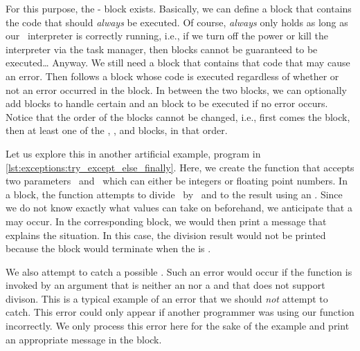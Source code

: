 For this purpose, the - block exists.
Basically, we can define a  block that contains the code that should \emph{always} be executed.
Of course, \emph{always} only holds as long as our \python\ interpreter is correctly running, i.e., if we turn off the power or kill the interpreter via the task manager, then  blocks cannot be guaranteed to be executed{\dots}
Anyway.
We still need a  block that contains that code that may cause an error.
Then follows a  block whose code is executed regardless of whether or not an error occurred in the  block.
In between the two blocks, we can optionally add  blocks to handle certain  and an  block to be executed if no error occurs.
Notice that the order of the blocks cannot be changed, i.e., first comes the  block, then at least one of the , , and  blocks, in that order.
%
%
\FloatBarrier%
%
%
%
%
%
%
\begin{sloppypar}%
Let us explore this in another artificial example, program  in \cref{lst:exceptions:try_except_else_finally}.
Here, we create the function  that accepts two parameters~ and~ which can either be integers or floating point numbers.
In a  block, the function attempts to divide~ by~ and to  the result using an .
Since we do not know exactly what values  can take on beforehand, we anticipate that a  may occur.
In the corresponding  block, we would then print a message that explains the situation.
In this case, the division result would not be printed because the  block would terminate when the  is .%
\end{sloppypar}%
%
We also attempt to catch a possible .
Such an error would occur if the function is invoked by an argument that is neither an  nor a  and that does not support divison.
This is a typical example of an error that we should \emph{not} attempt to catch.
This error could only appear if another programmer was using our function incorrectly.
We only process this error here for the sake of the example and print an appropriate message in the  block.

